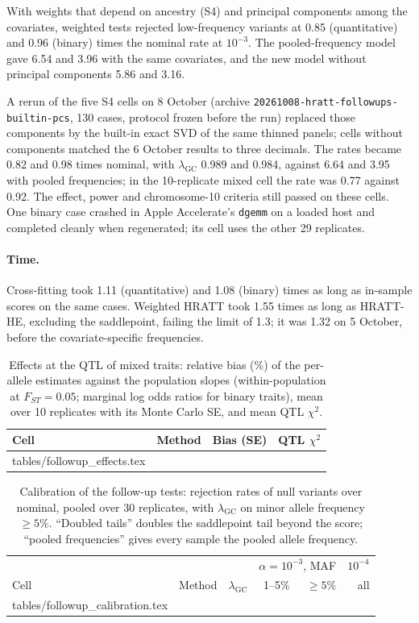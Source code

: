 \documentclass[11pt]{article}
\makeatletter
\newcommand{\lgc}{\lambda_{\mathrm{GC}}}
\newcommand{\code}[1]{\texttt{#1}}
\newcommand{\tabinput}[1]{\@@input #1 }
\makeatother
\begin{document}
With weights that depend on ancestry (S4) and principal components among
the covariates, weighted tests rejected low-frequency variants at 0.85
(quantitative) and 0.96 (binary) times the nominal rate at $10^{-3}$. The
pooled-frequency model gave 6.54 and 3.96 with the same covariates, and
the new model without principal components 5.86 and 3.16.

A rerun of the five S4 cells on 8 October (archive
\code{20261008-}\allowbreak\code{hratt-followups-}\allowbreak\code{builtin-pcs},
130 cases, protocol frozen before the run) replaced those components by the
built-in exact SVD of the same thinned panels; cells without components
matched the 6 October results to three decimals. The rates became 0.82 and 0.98
times nominal, with $\lgc$ 0.989 and 0.984, against 6.64 and 3.95 with pooled
frequencies; in the 10-replicate mixed cell the rate was 0.77 against 0.92.
The effect, power and chromosome-10 criteria still passed on these cells.
One binary case crashed in Apple Accelerate's \code{dgemm} on a loaded host
and completed cleanly when regenerated; its cell uses the other 29
replicates.

\paragraph{Time.}
Cross-fitting took 1.11 (quantitative) and 1.08 (binary) times as long as
in-sample scores on the same cases. Weighted HRATT took 1.55 times as long as
HRATT-HE, excluding the saddlepoint, failing the limit of 1.3; it was 1.32
on 5 October, before the covariate-specific frequencies.

\begin{table}[htbp]
 \centering\small
 \caption{Effects at the QTL of mixed traits: relative bias (\%) of the
 per-allele estimates against the population slopes (within-population at
 $F_{ST}=0.05$; marginal log odds ratios for binary traits), mean over 10
 replicates with its Monte Carlo SE, and mean QTL $\chi^2$.}
 \label{tab:followup-effects}
 \begin{tabular}{@{}llrr@{}}
 \toprule
 Cell & Method & Bias (SE) & QTL $\chi^2$ \\
 \midrule
 \tabinput{tables/followup_effects.tex}
 \bottomrule
 \end{tabular}
\end{table}

\begin{table}[htbp]
 \centering\small
 \caption{Calibration of the follow-up tests: rejection rates of null
 variants over nominal, pooled over 30 replicates, with $\lgc$ on minor
 allele frequency $\ge5\%$. ``Doubled tails'' doubles the saddlepoint tail
 beyond the score; ``pooled frequencies'' gives every sample the pooled
 allele frequency.}
 \label{tab:followup-calibration}
 \begin{tabular}{@{}llrrrr@{}}
 \toprule
 & & & \multicolumn{2}{c}{$\alpha=10^{-3}$, MAF} & $10^{-4}$ \\
 Cell & Method & $\lgc$ & 1--5\% & $\ge5\%$ & all \\
 \midrule
 \tabinput{tables/followup_calibration.tex}
 \bottomrule
 \end{tabular}
\end{table}
\end{document}
